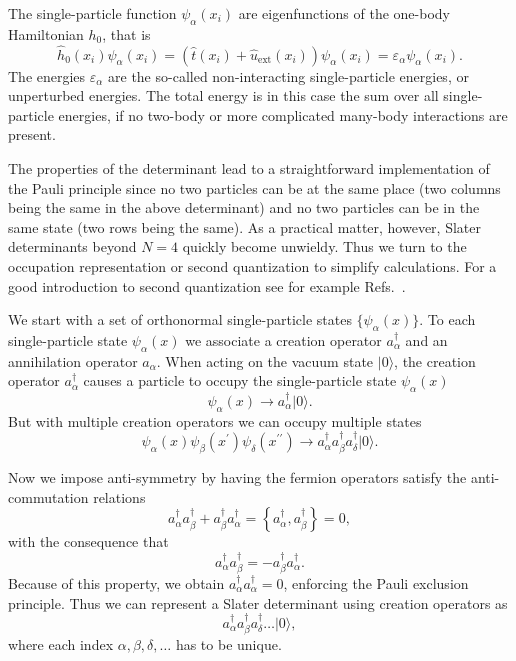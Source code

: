 The single-particle function $\psi_{\alpha}(x_i)$ are eigenfunctions
of the one-body Hamiltonian $h_0$, that is
\[
\hat{h}_0(x_i) \psi_{\alpha}(x_i)=\left(\hat{t}(x_i) +
\hat{u}_{\mathrm{ext}}(x_i)\right)\psi_{\alpha}(x_i)=\varepsilon_{\alpha}\psi_{\alpha}(x_i).
\]
The energies $\varepsilon_{\alpha}$ are the so-called non-interacting
single-particle energies, or unperturbed energies.  The total energy
is in this case the sum over all single-particle energies, if no
two-body or more complicated many-body interactions are present.

The properties of the determinant lead to a straightforward
implementation of the Pauli principle since no two particles can be at
the same place (two columns being the same in the above determinant)
and no two particles can be in the same state (two rows being the
same).  As a practical matter, however, Slater determinants beyond
$N=4$ quickly become unwieldy. Thus we turn to the occupation
  representation or second quantization to simplify
calculations. For a good introduction to second quantization see for
example Refs.~\cite{blaizot,Dickhoff2008,Mattuck1992,shavittbartlett2009}.

We start with a set of orthonormal single-particle states $\{
\psi_{\alpha}(x) \}$.  To each single-particle state
$\psi_{\alpha}(x)$ we associate a creation operator
$a^\dagger_{\alpha}$ and an annihilation operator $a_{\alpha}$.  When
acting on the vacuum state $| 0 \rangle$, the creation operator
$a^\dagger_{\alpha}$ causes a particle to occupy the single-particle
state $\psi_{\alpha}(x)$
\[
\psi_{\alpha}(x) \rightarrow a^\dagger_{\alpha} |0 \rangle.
\]
But with multiple creation operators we can occupy multiple states
\[
\psi_{\alpha}(x) \psi_{\beta}(x^\prime) \psi_{\delta}(x^{\prime
  \prime}) \rightarrow a^\dagger_{\alpha} a^\dagger_{\beta}
a^\dagger_{\delta} |0 \rangle.
\]

Now we impose anti-symmetry by having the fermion operators satisfy
the anti-commutation relations
\[
a^\dagger_{\alpha} a^\dagger_{\beta} + a^\dagger_{\beta}
a^\dagger_{\alpha} = \left\{ a^\dagger_{\alpha}
,a^\dagger_{\beta}\right\}= 0,
\]
with the consequence that
\[
a^\dagger_{\alpha} a^\dagger_{\beta} = - a^\dagger_{\beta}
a^\dagger_{\alpha}.
\]
Because of this property, we obtain $a^\dagger_{\alpha}
a^\dagger_{\alpha} = 0$, enforcing the Pauli exclusion principle.
Thus we can represent a Slater determinant using creation operators as
\[
a^\dagger_{\alpha} a^\dagger_{\beta} a^\dagger_{\delta} \ldots |0\rangle,
\]
where each index $\alpha,\beta,\delta, \ldots$ has to be unique.

